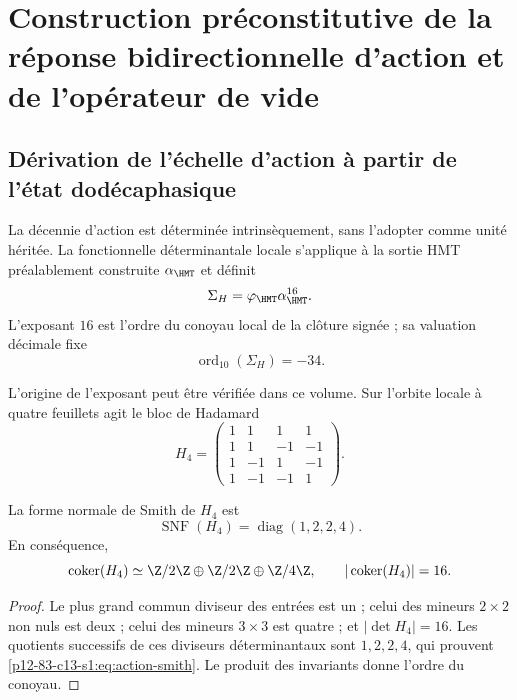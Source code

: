 \label{chap:83-13}

\section{Construction préconstitutive de la réponse bidirectionnelle d'action et de l'opérateur de vide}
\label{p12-83-c13-s1:ch:vacuum}

\subsection{Dérivation de l'échelle d'action à partir de l'état dodécaphasique}

La décennie d'action est déterminée intrinsèquement, sans l'adopter comme
unité héritée. La fonctionnelle déterminantale locale s'applique à la sortie HMT
préalablement construite \(\alpha_{\HMT}\) et définit
\begin{equation}
\Sigma_H=\varphi_{\HMT}\alpha_{\HMT}^{16}.
\label{p12-83-c13-s1:eq:action-determinantal-reader}
\end{equation}
L'exposant \(16\) est l'ordre du conoyau local de la clôture signée ; sa valuation décimale fixe
\begin{equation}
\operatorname{ord}_{10}(\Sigma_H)=-34.
\label{p12-83-c13-s1:eq:action-decade}
\end{equation}

L'origine de l'exposant peut être vérifiée dans ce volume. Sur
l'orbite locale à quatre feuillets agit le bloc de Hadamard
\begin{equation}
H_4=
\begin{pmatrix}
1&1&1&1\\
1&1&-1&-1\\
1&-1&1&-1\\
1&-1&-1&1
\end{pmatrix}.
\label{p12-83-c13-s1:eq:action-hadamard}
\end{equation}

\begin{lemma}
La forme normale de Smith de \(H_4\) est
\begin{equation}
\operatorname{SNF}(H_4)=\operatorname{diag}(1,2,2,4).
\label{p12-83-c13-s1:eq:action-smith}
\end{equation}
En conséquence,
\[
\operatorname{coker}(H_4)\simeq
\Z/2\Z\oplus\Z/2\Z\oplus\Z/4\Z,
\qquad
|\operatorname{coker}(H_4)|=16.
\]
\end{lemma}

\begin{proof}
Le plus grand commun diviseur des entrées est un ; celui des mineurs
\(2\times2\) non nuls est deux ; celui des mineurs \(3\times3\) est quatre ; et
\(|\det H_4|=16\). Les quotients successifs de ces diviseurs déterminantaux
sont \(1,2,2,4\), qui prouvent \cref{p12-83-c13-s1:eq:action-smith}. Le produit des
invariants donne l'ordre du conoyau.
\end{proof}

